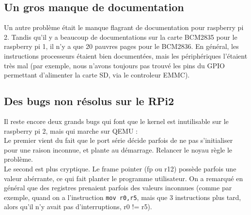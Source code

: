 \documentclass[a4paper]{article}
\begin{document}
\subsection{Un gros manque de documentation}

Un autre problème était le manque flagrant de documentation pour raspberry pi 2.
Tandis qu'il y a beaucoup de documentations sur la carte BCM2835 pour le
raspberry pi 1, il n'y a que 20 pauvres pages pour le BCM2836. En général, les
instructions processeurs étaient bien documentées, mais les périphériques
l'étaient très mal (par exemple, nous n'avons toujours pas trouvé les pins du
GPIO permettant d'alimenter la carte SD, via le controleur EMMC).

\subsection{Des bugs non résolus sur le RPi2}

Il reste encore deux grands bugs qui font que le kernel est inutilisable sur le
raspberry pi 2, mais qui marche sur QEMU :\\

Le premier vient du fait que le port série décide parfois de ne pas
s'initialiser pour une raison inconnue, et plante au démarrage. Relancer le
noyau règle le problème.\\

Le second est plus cryptique. Le frame pointer (fp ou r12) possède parfois une
valeur abérrante, ce qui fait planter le programme utilisateur. On a remarqué en
général que des registres prenaient parfois des valeurs inconnues (comme par
exemple, quand on a l'instruction \verb!mov r0,r5!, mais que 3 instructions plus
tard, alors qu'il n'y avait pas d'interruptions, r0 != r5).
\end{document}
